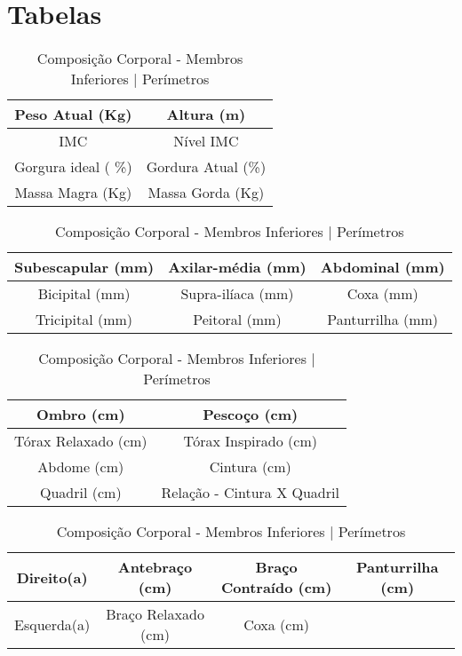 
\section{Tabelas}
\label{tabelas}
\begin{table}[!h]
\centering
\begin{tabular}{|c|c|}

\hline Peso Atual (Kg) & Altura (m) \\ 
\hline IMC & Nível IMC \\ 
\hline Gorgura ideal ( \%) & Gordura Atual (\%) \\ 
\hline Massa Magra (Kg) & Massa Gorda (Kg) \\ 
\hline 

\end{tabular}
\caption{Composição Corporal - Índices}
\vspace{1cm}

\begin{tabular}{|c|c|c|}
\hline Subescapular (mm) & Axilar-média (mm) & Abdominal (mm) \\ 
\hline Bicipital (mm) & Supra-ilíaca (mm) & Coxa (mm) \\ 
\hline Tricipital (mm) & Peitoral (mm) & Panturrilha (mm) \\ 
\hline 

\end{tabular} 
\caption{Composição Corporal - Dobras Cutâneas - Perímetros}
\vspace{1cm}

\begin{tabular}{|c|c|}
\hline Ombro (cm) & Pescoço (cm) \\ 
\hline Tórax Relaxado (cm) & Tórax Inspirado (cm) \\ 
\hline Abdome (cm) & Cintura (cm) \\ 
\hline Quadril (cm) & Relação - Cintura X Quadril \\ 
\hline 

\end{tabular} 
\caption{Composição Corporal - Membros Superiores | Perímetros}
\vspace{1cm}
\begin{tabular}{|c|c|c|c|}
\hline Direito(a) & Antebraço (cm) & Braço Contraído (cm) & Panturrilha (cm) \\ 
\hline Esquerda(a) & Braço Relaxado (cm) & Coxa (cm) &  \\ 
\hline 

\end{tabular} 
\caption{Composição Corporal - Membros Inferiores | Perímetros}
\end{table}


